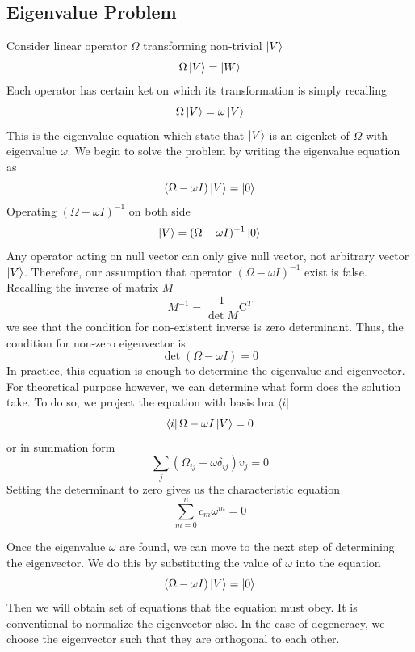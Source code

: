 \documentclass[../../../main.tex]{subfiles}
\begin{document}
\subsection{Eigenvalue Problem}
Consider linear operator $\Omega$ transforming non-trivial $\ket{V}$
\begin{equation*}
	\Omega 	\ket{V}=\ket{W}
\end{equation*}
Each operator has certain ket on which its transformation is simply recalling
\begin{equation*}
	\Omega \ket{V}=\omega \ket{V}
\end{equation*}
This is the eigenvalue equation which state that $\ket{V}$ is an eigenket of $\Omega$ with eigenvalue $\omega$.
We begin to solve the problem by writing the eigenvalue equation as
\begin{equation*}
	(\Omega-\omega I)\ket{V}=\ket{0}
\end{equation*}
Operating $(\Omega-\omega I)^{-1}$ on both side
\begin{equation*}
	\ket{V}=(\Omega-\omega I)^{-1}\ket{0}
\end{equation*}
Any operator acting on null vector can only give null vector, not arbitrary vector $\ket{V}$.
Therefore, our assumption that operator $(\Omega-\omega I)^{-1}$ exist is false.
Recalling the inverse of matrix $M$
\begin{equation*}
	M^{-1}=\frac{1}{\det M}\text{C}^T
\end{equation*}
we see that the condition for non-existent inverse is zero determinant.
Thus, the condition for non-zero eigenvector is
\begin{equation*}
	\det (\Omega-\omega I)=0
\end{equation*}
In practice, this equation is enough to determine the eigenvalue and eigenvector.
For theoretical purpose however, we can determine what form does the solution take.
To do so, we project the equation with basis bra $\bra{i}$
\begin{equation*}
	\bra{i}\Omega-\omega I\ket{V}=0
\end{equation*}
or in summation form
\begin{equation*}
	\sum_j (\Omega_{ij}-\omega\delta_{ij})v_j=0
\end{equation*}
Setting the determinant to zero gives us the characteristic equation
\begin{equation*}
	\sum_{m=0}^{n}c_m\omega^{m}=0
\end{equation*}

Once the eigenvalue $\omega$ are found, we can move to the next step of determining the eigenvector.
We do this by substituting the value of $\omega$ into the equation
\begin{equation*}
	(\Omega-\omega I)\ket{V}=\ket{0}
\end{equation*}
Then we will obtain set of equations that the equation must obey.
It is conventional to normalize the eigenvector also.
In the case of degeneracy, we choose the eigenvector such that they are orthogonal to each other.
\end{document}
